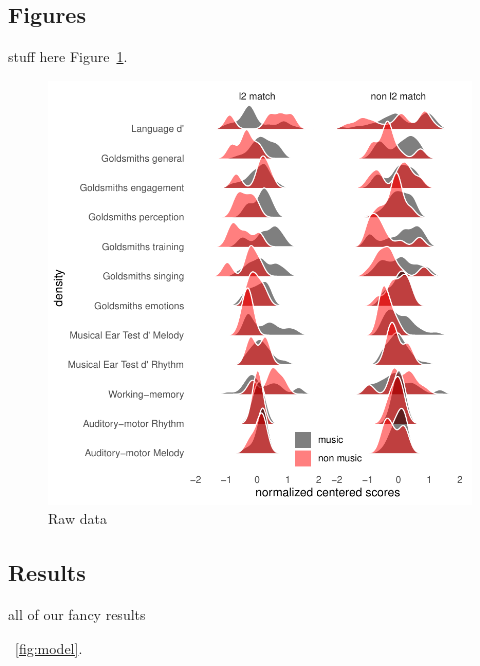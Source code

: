 \documentclass[a4paper]{article}
\begin{document}
\subsection{Figures}

stuff here Figure~\ref{fig:raw_data}.

\begin{figure}[t]
  \centering
  \includegraphics[width=\linewidth]{SP_24_visuals/Normalized_score_distrubutions_by_task.pdf}
  \caption{Raw data}
  \label{fig:raw_data}
\end{figure}

\subsection{Results}

all of our fancy results

~\ref{fig:model}.
\end{document}
